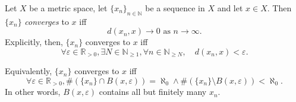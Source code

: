 \begin{definition}
	Let $X$ be a metric space, let $\{x_n\}_{n \in \mathbb N}$ be a sequence in $X$ and let $x \in X$. Then $\{x_n\}$ \textit{converges} to $x$ iff
	$$
	d(x_n, x) \to 0 \text{ as } n \to \infty.
	$$
	Explicitly, then, $\{ x_n \}$ converges to $x$ iff
	$$
	\forall \varepsilon \in \mathbb R_{> 0}, \exists N \in \mathbb N_{\ge 1}, \forall n \in \mathbb N_{\ge N}, \quad d(x_n , x) < \varepsilon.
	$$
\end{definition}


\begin{note}
	Equivalently, $\{x_n\}$ converges to $x$ iff
	$$
	\forall \varepsilon \in \mathbb R_{>0}, \# (\{ x_n \} \cap B(x,\varepsilon)) = \aleph_0 \land \# ( \{x_n\} \setminus B(x, \varepsilon)) < \aleph_0.
	$$
	In other words, $B(x, \varepsilon)$ contains all but finitely many $x_n$.
\end{note}


































%